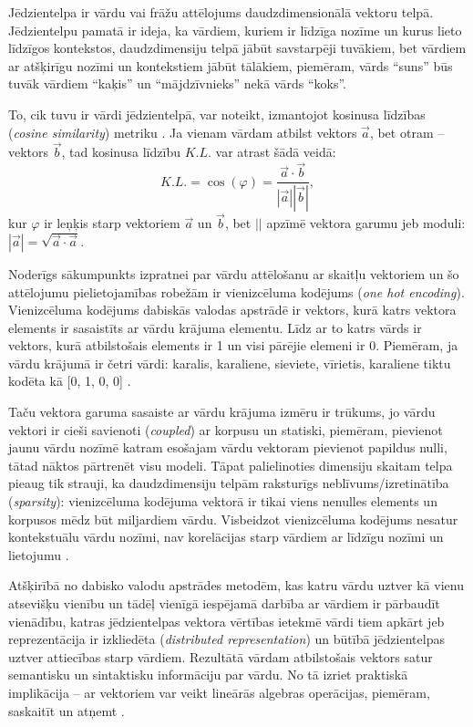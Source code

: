 Jēdzientelpa ir vārdu vai frāžu attēlojums daudzdimensionālā vektoru telpā. Jēdzientelpu pamatā ir ideja, ka vārdiem, kuriem ir līdzīga nozīme un kurus lieto līdzīgos kontekstos, daudzdimensiju telpā jābūt savstarpēji tuvākiem, bet vārdiem ar atšķirīgu nozīmi un kontekstiem jābūt tālākiem, piemēram, vārds “suns” būs tuvāk vārdiem “kaķis” un “mājdzīvnieks” nekā vārds “koks”.

To, cik tuvu ir vārdi jēdzientelpā, var noteikt, izmantojot kosinusa līdzības (\textit{cosine similarity}) metriku \cite{dangeti2017}. Ja vienam vārdam atbilst vektors $\vec{a}$, bet otram -- vektors $\vec{b}$, tad kosinusa līdzību $K.L.$ var atrast šādā veidā: $$K.L. = \cos(\varphi) = \frac{\vec{a} \cdot \vec{b}}{|\vec{a}| |\vec{b}|},$$ 
kur $\varphi$ ir leņķis starp vektoriem $\vec{a}$ un $\vec{b}$, bet $||$ apzīmē vektora garumu jeb moduli: $|\vec{a}| = \sqrt{\vec{a} \cdot \vec{a}}$.


Noderīgs sākumpunkts izpratnei par vārdu attēlošanu ar skaitļu vektoriem un šo attēlojumu pielietojamības robežām ir vienizcēluma kodējums (\textit{one hot encoding}). Vienizcēluma kodējums dabiskās valodas apstrādē ir vektors, kurā katrs vektora elements ir sasaistīts ar vārdu krājuma elementu. Līdz ar to katrs vārds ir vektors, kurā atbilstošais elements ir 1 un visi pārējie elemeni ir 0. Piemēram, ja vārdu krājumā ir četri vārdi: karalis, karaliene, sieviete, vīrietis, karaliene tiktu kodēta kā [0, 1, 0, 0] \cite{colyer2016}.

Taču vektora garuma sasaiste ar vārdu krājuma izmēru ir trūkums, jo vārdu vektori ir cieši savienoti (\textit{coupled}) ar korpusu un statiski, piemēram, pievienot jaunu vārdu nozīmē katram esošajam vārdu vektoram pievienot papildus nulli, tātad nāktos pārtrenēt visu modeli. Tāpat palielinoties dimensiju skaitam telpa pieaug tik strauji, ka daudzdimensiju telpām raksturīgs neblīvums/izretinātība (\textit{sparsity}): vienizcēluma kodējuma vektorā ir tikai viens nenulles elements un korpusos mēdz būt miljardiem 
vārdu. Visbeidzot vienizcēluma kodējums nesatur kontekstuālu vārdu nozīmi, nav korelācijas starp vārdiem ar līdzīgu nozīmi un lietojumu \cite{colyer2016}.

Atšķirībā no dabisko valodu apstrādes metodēm, kas katru vārdu uztver kā vienu atsevišķu vienību un tādēļ vienīgā iespējamā darbība ar vārdiem ir pārbaudīt vienādību, katras jēdzientelpas vektora vērtības ietekmē vārdi tiem apkārt jeb reprezentācija ir izkliedēta (\textit{distributed representation}) un būtībā jēdzientelpas uztver attiecības starp vārdiem. Rezultātā vārdam atbilstošais vektors satur semantisku un sintaktisku informāciju par vārdu. No tā izriet praktiskā implikācija -- ar vektoriem var veikt lineārās algebras operācijas, piemēram, saskaitīt un atņemt \cite{colyer2016}.

